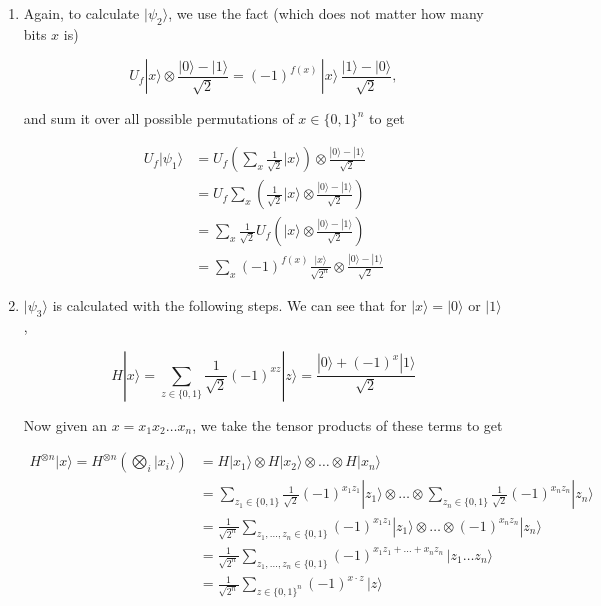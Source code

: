 \documentclass{article}
\theoremstyle{definition}
\begin{document}
    \begin{enumerate}
      \item Again, to calculate $|\psi_2 \rangle$, we use the fact (which does not matter how many bits $x$ is)

        \[U_f |x\rangle \otimes \frac{|0\rangle - |1\rangle}{\sqrt{2}} = (-1)^{f(x)} \,|x\rangle \, \frac{|1\rangle - |0\rangle}{\sqrt{2}},\]

      and sum it over all possible permutations of $x \in \{0, 1\}^n$ to get 

      \begin{align*} 
        U_f |\psi_1 \rangle & = U_f \left( \sum_x \frac{1}{\sqrt{2}} |x\rangle \right) \otimes \frac{|0\rangle - |1\rangle}{\sqrt{2}} \\
        & = U_f \sum_x \left( \frac{1}{\sqrt{2}} |x\rangle \otimes \frac{|0\rangle - |1\rangle}{\sqrt{2}}\right) \\
        & = \sum_x \frac{1}{\sqrt{2}} U_f \left( |x\rangle \otimes \frac{|0\rangle - |1\rangle}{\sqrt{2}} \right) \\
        & = \sum_x (-1)^{f(x)} \frac{|x\rangle}{\sqrt{2^n}} \otimes \frac{|0\rangle - |1\rangle}{\sqrt{2}}
      \end{align*}

      \item $|\psi_3 \rangle$ is calculated with the following steps. We can see that for $|x\rangle = |0\rangle$ or $|1\rangle$, 

        \[H|x\rangle = \sum_{z \in \{0, 1\}} \frac{1}{\sqrt{2}} (-1)^{xz} |z\rangle = \frac{|0\rangle + (-1)^x |1\rangle}{\sqrt{2}}\]

      Now given an $x = x_1 x_2 \ldots x_n$, we take the tensor products of these terms to get 

      \begin{align*} 
        H^{\otimes n} |x\rangle = H^{\otimes n} \left( \bigotimes_i |x_i \rangle \right) & = H|x_1\rangle \otimes H|x_2\rangle \otimes \ldots \otimes H|x_n\rangle \\
        & = \sum_{z_1 \in \{0, 1\}} \frac{1}{\sqrt{2}} (-1)^{x_1 z_1} |z_1 \rangle \otimes \ldots \otimes \sum_{z_n \in \{0, 1\}} \frac{1}{\sqrt{2}} (-1)^{x_n z_n} |z_n \rangle \\
        & = \frac{1}{\sqrt{2^n}} \sum_{z_1, \ldots, z_n \in \{0, 1\}} (-1)^{x_1 z_1} |z_1 \rangle \otimes \ldots \otimes (-1)^{x_n z_n} |z_n\rangle \\
        & = \frac{1}{\sqrt{2^n}} \sum_{z_1, \ldots, z_n \in \{0, 1\}} (-1)^{x_1 z_1 + \ldots + x_n z_n} \, |z_1 \ldots z_n \rangle \\
        & = \frac{1}{\sqrt{2^n}} \sum_{z \in \{0, 1\}^n} (-1)^{x \cdot z} \, |z\rangle
      \end{align*}


\end{enumerate}
\end{document}

